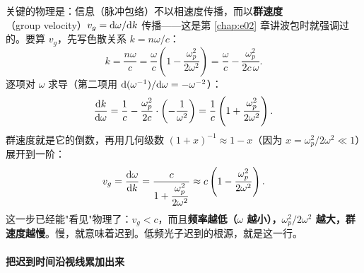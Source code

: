 关键的物理是：信息（脉冲包络）不以相速度传播，而以\textbf{群速度}（group velocity）\(v_g={\rm d}\omega/{\rm d}k\) 传播——这是第 \ref{chap:e02} 章讲波包时就强调过的。要算 \(v_g\)，先写色散关系 \(k=n\omega/c\)：
\[
  k=\frac{n\omega}{c}
   =\frac{\omega}{c}\left(1-\frac{\omega_p^2}{2\omega^2}\right)
   =\frac{\omega}{c}-\frac{\omega_p^2}{2c\,\omega}.
\]
逐项对 \(\omega\) 求导（第二项用 \({\rm d}(\omega^{-1})/{\rm d}\omega=-\omega^{-2}\)）：
\[
  \frac{{\rm d}k}{{\rm d}\omega}
  =\frac{1}{c}-\frac{\omega_p^2}{2c}\cdot\left(-\frac{1}{\omega^2}\right)
  =\frac{1}{c}\left(1+\frac{\omega_p^2}{2\omega^2}\right).
\]
群速度就是它的倒数，再用几何级数 \((1+x)^{-1}\approx1-x\)（因为 \(x=\omega_p^2/2\omega^2\ll1\)）展开到一阶：
\[
  v_g=\frac{{\rm d}\omega}{{\rm d}k}
     =\frac{c}{1+\dfrac{\omega_p^2}{2\omega^2}}
     \approx c\left(1-\frac{\omega_p^2}{2\omega^2}\right).
\]
这一步已经能"看见"物理了：\(v_g<c\)，而且\textbf{频率越低（\(\omega\) 越小），\(\omega_p^2/2\omega^2\) 越大，群速度越慢}。慢，就意味着迟到。低频光子迟到的根源，就是这一行。

\paragraph{把迟到时间沿视线累加出来}
\label{sec:e21-dmderive}

